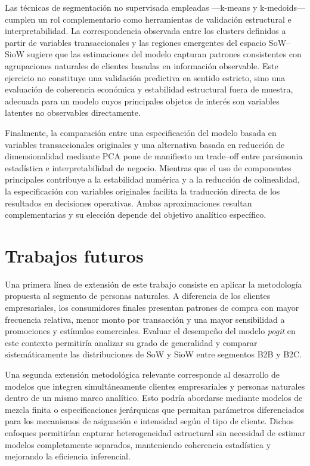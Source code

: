 Las técnicas de segmentación no supervisada empleadas —k-means y k-medoids— cumplen un rol complementario como herramientas de validación estructural e interpretabilidad. La correspondencia observada entre los clusters definidos a partir de variables transaccionales y las regiones emergentes del espacio SoW--SioW sugiere que las estimaciones del modelo capturan patrones consistentes con agrupaciones naturales de clientes basadas en información observable. Este ejercicio no constituye una validación predictiva en sentido estricto, sino una evaluación de coherencia económica y estabilidad estructural fuera de muestra, adecuada para un modelo cuyos principales objetos de interés son variables latentes no observables directamente.

Finalmente, la comparación entre una especificación del modelo basada en variables transaccionales originales y una alternativa basada en reducción de dimensionalidad mediante PCA pone de manifiesto un trade--off entre parsimonia estadística e interpretabilidad de negocio. Mientras que el uso de componentes principales contribuye a la estabilidad numérica y a la reducción de colinealidad, la especificación con variables originales facilita la traducción directa de los resultados en decisiones operativas. Ambas aproximaciones resultan complementarias y su elección depende del objetivo analítico específico.

\section{Trabajos futuros}

Una primera línea de extensión de este trabajo consiste en aplicar la metodología propuesta al segmento de personas naturales. A diferencia de los clientes empresariales, los consumidores finales presentan patrones de compra con mayor frecuencia relativa, menor monto por transacción y una mayor sensibilidad a promociones y estímulos comerciales. Evaluar el desempeño del modelo \emph{pogit} en este contexto permitiría analizar su grado de generalidad y comparar sistemáticamente las distribuciones de SoW y SioW entre segmentos B2B y B2C.

Una segunda extensión metodológica relevante corresponde al desarrollo de modelos que integren simultáneamente clientes empresariales y personas naturales dentro de un mismo marco analítico. Esto podría abordarse mediante modelos de mezcla finita o especificaciones jerárquicas que permitan parámetros diferenciados para los mecanismos de asignación e intensidad según el tipo de cliente. Dichos enfoques permitirían capturar heterogeneidad estructural sin necesidad de estimar modelos completamente separados, manteniendo coherencia estadística y mejorando la eficiencia inferencial.

